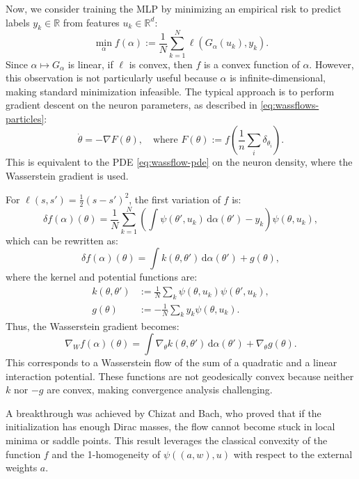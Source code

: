 Now, we consider training the MLP by minimizing an empirical risk to predict labels $y_k \in \mathbb{R}$ from features $u_k \in \mathbb{R}^d$:
\begin{equation}
    \min_\alpha f(\alpha) := \frac{1}{N} \sum_{k=1}^N \ell(G_\alpha(u_k), y_k).
\end{equation}
Since $\alpha \mapsto G_\alpha$ is linear, if $\ell$ is convex, then $f$ is a convex function of $\alpha$. However, this observation is not particularly useful because $\alpha$ is infinite-dimensional, making standard minimization infeasible. The typical approach is to perform gradient descent on the neuron parameters, as described in \eqref{eq:wassflows-particles}:
\begin{equation}
    \dot{\theta} = -\nabla F(\theta), \quad \text{where } F(\theta) := f\left(\frac{1}{n} \sum_i \delta_{\theta_i}\right).
\end{equation}
This is equivalent to the PDE \eqref{eq:wassflow-pde} on the neuron density, where the Wasserstein gradient is used.

For $\ell(s, s') = \frac{1}{2}(s - s')^2$, the first variation of $f$ is:
\begin{equation}
    \delta f(\alpha)(\theta) = \frac{1}{N} \sum_{k=1}^N \left(\int \psi(\theta', u_k) \, \mathrm{d} \alpha(\theta') - y_k\right) \psi(\theta, u_k),
\end{equation}
which can be rewritten as:
\begin{equation}
    \delta f(\alpha)(\theta) = \int k(\theta, \theta') \, \mathrm{d} \alpha(\theta') + g(\theta),
\end{equation}
where the kernel and potential functions are:
\begin{align}
    k(\theta, \theta') &:= \frac{1}{N} \sum_k \psi(\theta, u_k) \psi(\theta', u_k), \\
    g(\theta) &:= -\frac{1}{N} \sum_k y_k \psi(\theta, u_k).
\end{align}
Thus, the Wasserstein gradient becomes:
\begin{equation}
    \nabla_W f(\alpha)(\theta) = \int \nabla_\theta k(\theta, \theta') \, \mathrm{d} \alpha(\theta') + \nabla_\theta g(\theta).
\end{equation}
This corresponds to a Wasserstein flow of the sum of a quadratic and a linear interaction potential. These functions are not geodesically convex because neither $k$ nor $-g$ are convex, making convergence analysis challenging.

A breakthrough was achieved by Chizat and Bach, who proved that if the initialization has enough Dirac masses, the flow cannot become stuck in local minima or saddle points. This result leverages the classical convexity of the function $f$ and the 1-homogeneity of $\psi((a, w), u)$ with respect to the external weights $a$.

